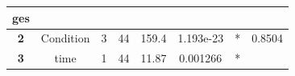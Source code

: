 \documentclass[]{article}
\theoremstyle{definition}
\theoremstyle{definition}
\theoremstyle{definition}
\theoremstyle{remark}
\begin{document}
\begin{longtable}[]{@{}cccccccc@{}}
\begin{minipage}[b]{0.08\columnwidth}
ges\strut
\end{minipage}\tabularnewline
\midrule
\endhead
\begin{minipage}[t]{0.10\columnwidth}\centering\strut
\textbf{2}\strut
\end{minipage} & \begin{minipage}[t]{0.18\columnwidth}\centering\strut
Condition\strut
\end{minipage} & \begin{minipage}[t]{0.06\columnwidth}\centering\strut
3\strut
\end{minipage} & \begin{minipage}[t]{0.06\columnwidth}\centering\strut
44\strut
\end{minipage} & \begin{minipage}[t]{0.08\columnwidth}\centering\strut
159.4\strut
\end{minipage} & \begin{minipage}[t]{0.13\columnwidth}\centering\strut
1.193e-23\strut
\end{minipage} & \begin{minipage}[t]{0.08\columnwidth}\centering\strut
*\strut
\end{minipage} & \begin{minipage}[t]{0.08\columnwidth}\centering\strut
0.8504\strut
\end{minipage}\tabularnewline
\begin{minipage}[t]{0.10\columnwidth}\centering\strut
\textbf{3}\strut
\end{minipage} & \begin{minipage}[t]{0.18\columnwidth}\centering\strut
time\strut
\end{minipage} & \begin{minipage}[t]{0.06\columnwidth}\centering\strut
1\strut
\end{minipage} & \begin{minipage}[t]{0.06\columnwidth}\centering\strut
44\strut
\end{minipage} & \begin{minipage}[t]{0.08\columnwidth}\centering\strut
11.87\strut
\end{minipage} & \begin{minipage}[t]{0.13\columnwidth}\centering\strut
0.001266\strut
\end{minipage} & \begin{minipage}[t]{0.08\columnwidth}\centering\strut
*\strut
\end{minipage} & \begin{minipage}[t]{0.08\columnwidth}\centering\strut

\end{minipage}
\end{longtable}
\end{document}
